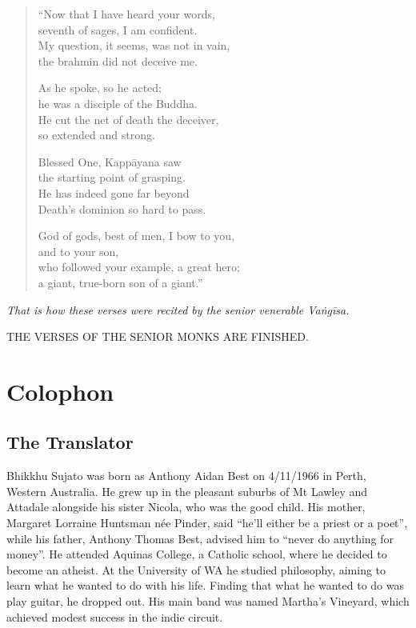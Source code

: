 \documentclass[12pt,openany]{book}%
\newcommand*{\scendsutta}[1]{\begin{Center}\textit{#1}\end{Center}\addvspace{1em}}
\newcommand*{\scendbook}[1]{\bigskip\begin{Center}\uppercase{#1}\end{Center}\addvspace{1em}}
\let\oldbackmatter\backmatter
\renewcommand{\backmatter}{%
\chapterfont{\setstretch{.85}\normalfont\centering}%
\sectionfont{\setstretch{.85}\normalfont\BalancedRagged}%
\pagestyle{plainer}%
\oldbackmatter}
\begin{document}
\begin{verse}
“Now that I have heard your words, \\
seventh of sages, I am confident. \\
My question, it seems, was not in vain, \\
the brahmin did not deceive me. 

As he spoke, so he acted; \\
he was a disciple of the Buddha. \\
He cut the net of death the deceiver, \\
so extended and strong. 

Blessed One, \textsanskrit{Kappāyana} saw \\
the starting point of grasping. \\
He has indeed gone far beyond \\
Death’s dominion so hard to pass. 

God of gods, best of men, I bow to you, \\
and to your son, \\
who followed your example, a great hero; \\
a giant, true-born son of a giant.” 

%
\end{verse}

\scendsutta{That is how these verses were recited by the senior venerable \textsanskrit{Vaṅgīsa}. }

\scendbook{The Verses of the Senior Monks are finished. }

%
\backmatter%
\chapter*{Colophon}

\section*{The Translator}

Bhikkhu Sujato was born as Anthony Aidan Best on 4/11/1966 in Perth, Western Australia. He grew up in the pleasant suburbs of Mt Lawley and Attadale alongside his sister Nicola, who was the good child. His mother, Margaret Lorraine Huntsman née Pinder, said “he’ll either be a priest or a poet”, while his father, Anthony Thomas Best, advised him to “never do anything for money”. He attended Aquinas College, a Catholic school, where he decided to become an atheist. At the University of WA he studied philosophy, aiming to learn what he wanted to do with his life. Finding that what he wanted to do was play guitar, he dropped out. His main band was named Martha’s Vineyard, which achieved modest success in the indie circuit. 
\end{document}
